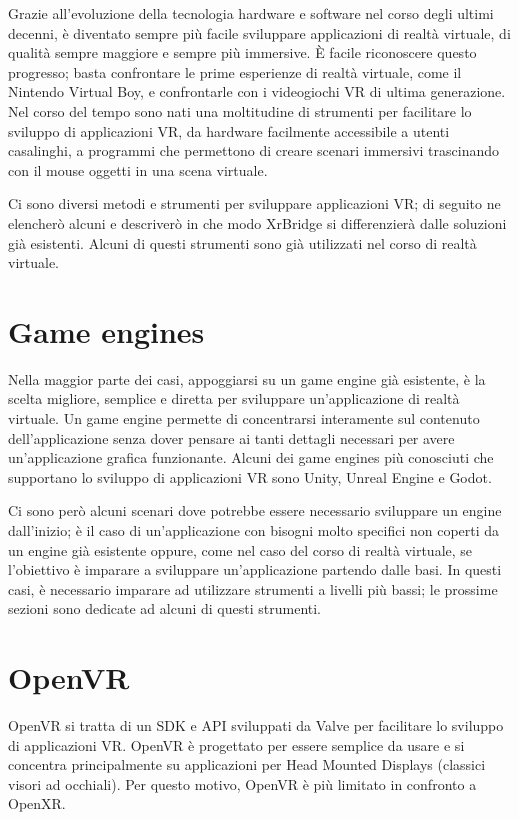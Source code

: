 \documentclass[twoside]{supsistudent}
\begin{document}
Grazie all'evoluzione della tecnologia hardware e software nel corso degli ultimi decenni, è diventato sempre più facile sviluppare applicazioni di realtà virtuale, di qualità sempre maggiore e sempre più immersive. È facile riconoscere questo progresso; basta confrontare le prime esperienze di realtà virtuale, come il Nintendo Virtual Boy, e confrontarle con i videogiochi VR di ultima generazione. Nel corso del tempo sono nati una moltitudine di strumenti per facilitare lo sviluppo di applicazioni VR, da hardware facilmente accessibile a utenti casalinghi, a programmi che permettono di creare scenari immersivi trascinando con il mouse oggetti in una scena virtuale.

Ci sono diversi metodi e strumenti per sviluppare applicazioni VR; di seguito ne elencherò alcuni e descriverò in che modo XrBridge si differenzierà dalle soluzioni già esistenti. Alcuni di questi strumenti sono già utilizzati nel corso di realtà virtuale.

\section{Game engines}

Nella maggior parte dei casi, appoggiarsi su un game engine già esistente, è la scelta migliore, semplice e diretta per sviluppare un'applicazione di realtà virtuale. Un game engine permette di concentrarsi interamente sul contenuto dell'applicazione senza dover pensare ai tanti dettagli necessari per avere un'applicazione grafica funzionante. Alcuni dei game engines più conosciuti che supportano lo sviluppo di applicazioni VR sono Unity, Unreal Engine e Godot.

Ci sono però alcuni scenari dove potrebbe essere necessario sviluppare un engine dall'inizio; è il caso di un'applicazione con bisogni molto specifici non coperti da un engine già esistente oppure, come nel caso del corso di realtà virtuale, se l'obiettivo è imparare a sviluppare un'applicazione partendo dalle basi. In questi casi, è necessario imparare ad utilizzare strumenti a livelli più bassi; le prossime sezioni sono dedicate ad alcuni di questi strumenti.

\section{OpenVR}

OpenVR si tratta di un SDK e API sviluppati da Valve per facilitare lo sviluppo di applicazioni VR. OpenVR è progettato per essere semplice da usare e si concentra principalmente su applicazioni per Head Mounted Displays (classici visori ad occhiali). Per questo motivo, OpenVR è più limitato in confronto a OpenXR.
\end{document}
